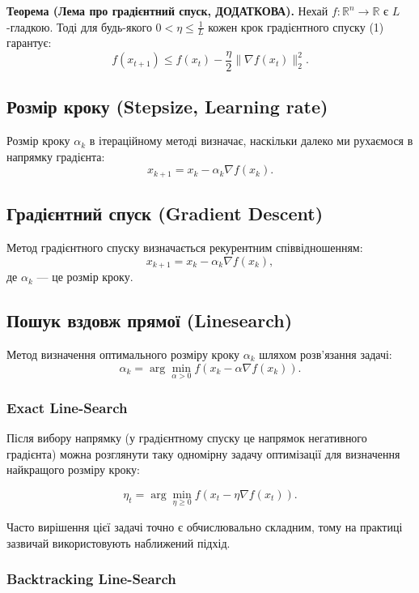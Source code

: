 \documentclass[a4paper,12pt]{article}
\begin{document}
\textbf{Теорема (Лема про градієнтний спуск, ДОДАТКОВА).}  
Нехай \( f: \mathbb{R}^n \to \mathbb{R} \) є \( L \)-гладкою.  
Тоді для будь-якого \( 0 < \eta \leq \frac{1}{L} \) кожен крок градієнтного спуску (1) гарантує:
\[
f(x_{t+1}) \leq f(x_t) - \frac{\eta}{2} \|\nabla f(x_t)\|_2^2.
\]


\subsection{Розмір кроку (Stepsize, Learning rate)}
Розмір кроку $\alpha_k$ в ітераційному методі визначає, наскільки далеко ми рухаємося в напрямку градієнта:
\begin{equation}
    x_{k+1} = x_k - \alpha_k \nabla f(x_k).
\end{equation}

\subsection{Градієнтний спуск (Gradient Descent)}
Метод градієнтного спуску визначається рекурентним співвідношенням:
\begin{equation}
    x_{k+1} = x_k - \alpha_k \nabla f(x_k),
\end{equation}
де $\alpha_k$ — це розмір кроку.

\subsection{Пошук вздовж прямої (Linesearch)}
Метод визначення оптимального розміру кроку $\alpha_k$ шляхом розв’язання задачі:
\begin{equation}
    \alpha_k = \arg\min_{\alpha > 0} f(x_k - \alpha \nabla f(x_k)).
\end{equation}

\subsubsection{Exact Line-Search}
Після вибору напрямку (у градієнтному спуску це напрямок негативного градієнта) можна розглянути таку одномірну задачу оптимізації для визначення найкращого розміру кроку:

\[
\eta_t = \arg\min_{\eta \geq 0} f(x_t - \eta \nabla f(x_t)).
\]

Часто вирішення цієї задачі точно є обчислювально складним, тому на практиці зазвичай використовують наближений підхід.

\subsubsection{Backtracking Line-Search}
\end{document}

